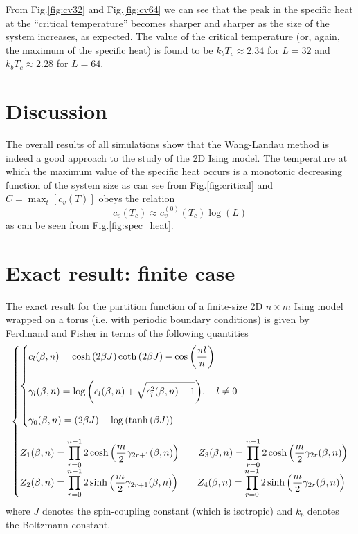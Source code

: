 \documentclass[11pt]{article}
\makeatletter
\newcommand{\figname}{Fig.}
\newenvironment{system}
		{\left\lbrace\begin{array}{@{}l@{}}}
		{\end{array}\right.}
\makeatother
\begin{document}
From \figname \ref{fig:cv32} and \figname \ref{fig:cv64} we can see that the peak in the specific heat at the ``critical temperature'' becomes sharper and sharper as the size of the system increases, as expected. The value of the critical temperature (or, again, the maximum of the specific heat) is found to be $k_bT_c \approx 2.34$ for $L=32$ and $k_bT_c \approx 2.28$ for $L=64$.

\section{Discussion}

The overall results of all simulations show that the Wang-Landau method is indeed a good approach to the study of the 2D Ising model. The temperature at which the maximum value of the specific heat occurs is a monotonic decreasing function of the system size as can see from \figname \ref{fig:critical} and $C = \max_t[c_v(T)]$ obeys the relation
\[
	c_v(T_c) \approx c_v^{(0)}(T_c)\log(L)
\]
as can be seen from \figname \ref{fig:spec_heat}.

\appendix

\section{Exact result: finite case}
\label{app:exact_finite}

The exact result for the partition function of a finite-size 2D $n \times m$ Ising model wrapped on a torus (i.e. with periodic boundary conditions) is given by Ferdinand and Fisher in terms of the following quantities
\[
\begin{system}
	\begin{system}
		\displaystyle	
		c_l(\beta,n) =	
					\cosh{(2\beta J)}\coth{(2\beta J)} -
					\cos{\left(\frac{\pi l}{n}\right)} 								\\
		\\
		\displaystyle
		\gamma_l(\beta,n) = 
					\log{\left(c_l(\beta,n) +
					\sqrt{c_l^2(\beta,n) - 1}\right)}, \quad l \neq 0	\\
		\\
		\displaystyle
		\gamma_0(\beta,n) = (2\beta J) + \log{(\tanh{(\beta J)})}
	\end{system}\\
	\\
\displaystyle 
	Z_1(\beta,n) = \prod_{r=0}^{n-1}
				2\cosh{\left(\frac{m}{2}\gamma_{2r+1}(\beta,n)\right)} 	\qquad
	Z_3(\beta,n) = \prod_{r=0}^{n-1}
				2\cosh{\left(\frac{m}{2}\gamma_{2r}(\beta,n)\right)} 	\\
\displaystyle
	Z_2(\beta,n) = \prod_{r=0}^{n-1}
				2\sinh{\left(\frac{m}{2}\gamma_{2r+1}(\beta,n)\right)}	\qquad
	Z_4(\beta,n) = \prod_{r=0}^{n-1}
				2\sinh{\left(\frac{m}{2}\gamma_{2r}(\beta,n)\right)}	\\
\end{system}
\]
where $J$ denotes the spin-coupling constant (which is isotropic) and $k_b$ denotes the Boltzmann constant.
\end{document}
